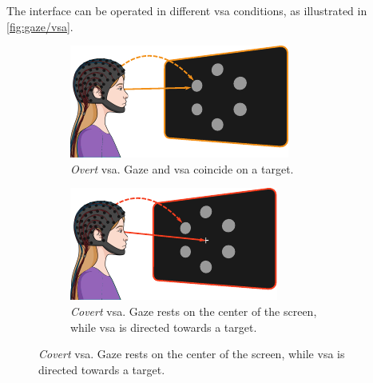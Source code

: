 The interface can be operated in different \ac{vsa} conditions, as illustrated in
\cref{fig:gaze/vsa}.
\begin{figure}
  \begin{subfigure}[t]{.45\textwidth}
    \includegraphics[width=\textwidth]{figures/gaze_independence/attention_overt.pdf}
    \caption[Overt \ac{vsa}]{%
      \emph{Overt} \ac{vsa}.
      Gaze and \ac{vsa} coincide on a target.
    }
    \label{fig:gaze/vsa/overt}
  \end{subfigure}\hfill%
  \begin{subfigure}[t]{.45\textwidth}
    \includegraphics[width=\textwidth]{figures/gaze_independence/attention_covert.pdf}
    \caption[Covert \ac{vsa}]{%
      \emph{Covert} \ac{vsa}.
      Gaze rests on the center of the screen, while \ac{vsa} is directed towards a target.
    }
    \label{fig:gaze/vsa/covert}
  \end{subfigure}


\end{figure}
